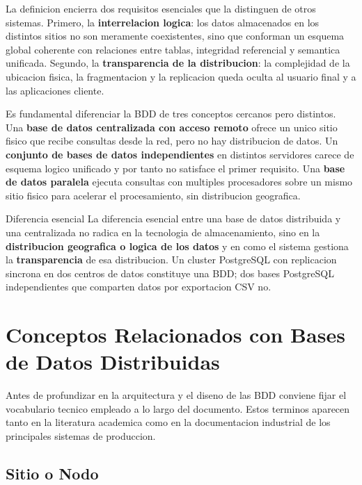\documentclass[11pt,a4paper]{article}
\begin{document}
La definicion encierra dos requisitos esenciales que la distinguen de otros sistemas. Primero, la \textbf{interrelacion logica}: los datos almacenados en los distintos sitios no son meramente coexistentes, sino que conforman un esquema global coherente con relaciones entre tablas, integridad referencial y semantica unificada. Segundo, la \textbf{transparencia de la distribucion}: la complejidad de la ubicacion fisica, la fragmentacion y la replicacion queda oculta al usuario final y a las aplicaciones cliente.

Es fundamental diferenciar la BDD de tres conceptos cercanos pero distintos. Una \textbf{base de datos centralizada con acceso remoto} ofrece un unico sitio fisico que recibe consultas desde la red, pero no hay distribucion de datos. Un \textbf{conjunto de bases de datos independientes} en distintos servidores carece de esquema logico unificado y por tanto no satisface el primer requisito. Una \textbf{base de datos paralela} ejecuta consultas con multiples procesadores sobre un mismo sitio fisico para acelerar el procesamiento, sin distribucion geografica.

\begin{notebox}{Diferencia esencial}
La diferencia esencial entre una base de datos distribuida y una centralizada no radica en la tecnologia de almacenamiento, sino en la \textbf{distribucion geografica o logica de los datos} y en como el sistema gestiona la \textbf{transparencia} de esa distribucion. Un cluster PostgreSQL con replicacion sincrona en dos centros de datos constituye una BDD; dos bases PostgreSQL independientes que comparten datos por exportacion CSV no.
\end{notebox}

\section{Conceptos Relacionados con Bases de Datos Distribuidas}

Antes de profundizar en la arquitectura y el diseno de las BDD conviene fijar el vocabulario tecnico empleado a lo largo del documento. Estos terminos aparecen tanto en la literatura academica como en la documentacion industrial de los principales sistemas de produccion.

\subsection{Sitio o Nodo}
\end{document}

